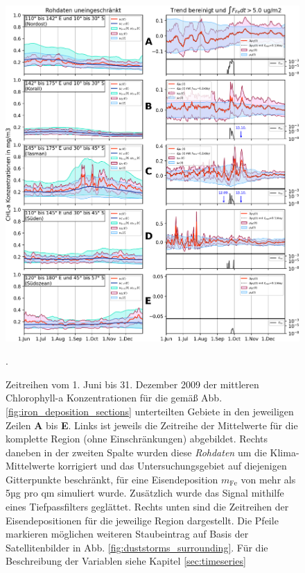 \documentclass[12pt,a4paper,onecolumn]{scrartcl}
\begin{document}
\begin{figure}
\includegraphics[width=\textwidth]{bilder/timeseries_all.png}
\caption{Zeitreihen vom 1. Juni bis 31. Dezember 2009 der mittleren Chlorophyll-a Konzentrationen für die gemäß Abb. \ref{fig:iron_deposition_sections} unterteilten Gebiete in den jeweiligen Zeilen \textbf{A} bis \textbf{E}. Links ist jeweils die Zeitreihe der Mittelwerte für die komplette Region (ohne Einschränkungen) abgebildet. Rechts daneben in der zweiten Spalte wurden diese \textit{Rohdaten} um die Klima-Mittelwerte korrigiert und das Untersuchungsgebiet auf diejenigen Gitterpunkte beschränkt, für eine Eisendeposition $m_\text{Fe}$ von mehr als 5µg pro qm simuliert wurde. Zusätzlich wurde das Signal mithilfe eines Tiefpassfilters geglättet. Rechts unten sind die Zeitreihen der Eisendepositionen für die jeweilige Region dargestellt. Die Pfeile markieren möglichen weiteren Staubeintrag auf Basis der Satellitenbilder in Abb. \ref{fig:duststorms_surrounding}. Für die Beschreibung der Variablen siehe Kapitel \ref{sec:timeseries}}. \label{fig:timeseries_full}
\end{figure}
\end{document}
